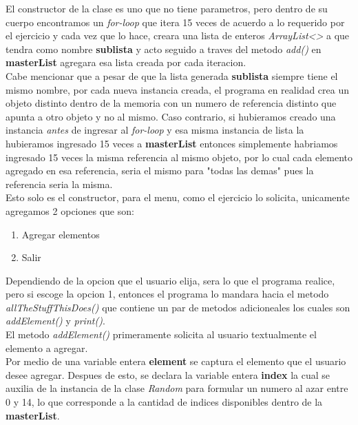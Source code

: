 \documentclass{article}
\begin{document}
			El constructor de la clase es uno que no tiene parametros, pero dentro de su cuerpo encontramos un \textit{for-loop} que itera 15 veces de acuerdo a lo requerido por el ejercicio y cada vez que lo hace, creara una lista de enteros \emph{ArrayList<>} a que tendra como nombre \textbf{sublista} y acto seguido a traves del metodo \emph{add()} en \textbf{masterList} agregara esa lista creada por cada iteracion.\\
			
			Cabe mencionar que a pesar de que la lista generada \textbf{sublista} siempre tiene el mismo nombre, por cada nueva instancia creada, el programa en realidad crea un objeto distinto dentro de la memoria con un numero de referencia distinto que apunta a otro objeto y no al mismo. Caso contrario, si hubieramos creado una instancia \textit{antes} de ingresar al \textit{for-loop} y esa misma instancia de lista la hubieramos ingresado 15 veces a \textbf{masterList} entonces simplemente habriamos ingresado 15 veces la misma referencia al mismo objeto, por lo cual cada elemento agregado en esa referencia, seria el mismo para "todas las demas" pues la referencia seria la misma.\\
			
			Esto solo es el constructor, para el menu, como el ejercicio lo solicita, unicamente agregamos 2 opciones que son:
			
			\begin{enumerate}
				\item Agregar elementos
				\item Salir
			\end{enumerate}
		
			Dependiendo de la opcion que el usuario elija, sera lo que el programa realice, pero si escoge la opcion 1, entonces el programa lo mandara hacia el metodo \emph{allTheStuffThisDoes()} que contiene un par de metodos adicioneales los cuales son \emph{addElement()} y \emph{print()}.\\
			
			El metodo \emph{addElement()} primeramente solicita al usuario textualmente el elemento a agregar.\\
			
			Por medio de una variable entera \textbf{element} se captura el elemento que el usuario desee agregar. Despues de esto, se declara la variable entera \textbf{index} la cual se auxilia de la instancia de la clase \emph{Random} para formular un numero al azar entre 0 y 14, lo que corresponde a la cantidad de indices disponibles dentro de la \textbf{masterList}.\\
			
\end{document}
